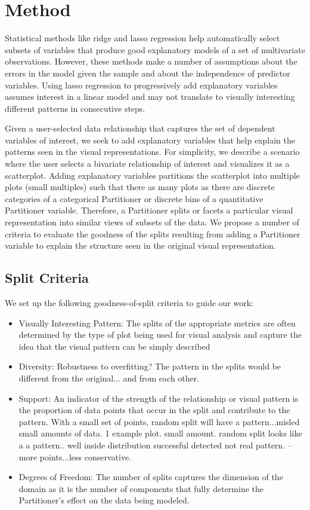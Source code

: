 \section{Method}
Statistical methods like ridge and lasso regression help automatically select subsets of variables that produce good explanatory models of a set of multivariate observations. However, these methods make a number of assumptions about the errors in the model given the sample and about the independence of predictor variables. Using lasso regression to progressively add explanatory variables assumes interest in a linear model and may not translate to visually interesting different patterns in consecutive steps. 

Given a user-selected data relationship that captures the set of dependent variables of interest, we seek to add explanatory variables that help explain the patterns seen in the visual representations. For simplicity, we describe a scenario where the user selects a bivariate relationship of interest and visualizes it as a scatterplot. Adding explanatory variables partitions the scatterplot into multiple plots (small multiples) such that there as many plots as there are discrete categories of a categorical Partitioner or discrete bins of a quantitative Partitioner variable. Therefore, a Partitioner splits or facets a particular visual representation into similar views of subsets of the data. We propose a number of criteria to evaluate the goodness of the splits resulting from adding a Partitioner variable to explain the structure seen in the original visual representation.

\subsection{Split Criteria}
We set up the following goodness-of-split criteria to guide our work:
\begin{itemize}
\item Visually Interesting Pattern: The splits of the  appropriate metrics are often determined by the type of plot being used for visual analysis and capture the idea that the visual pattern can be simply described

\item Diversity: Robustness to overfitting? The pattern in the splits would be different from the original... and from each other. 
\item Support: An indicator of the strength of the relationship or visual pattern is the proportion of data points that occur in the split and contribute to the pattern. With a small set of points, random split will have a pattern...misled small amounts of data. 1 example plot. small amount. random split looks like a a pattern.. well inside distribution successful detected not real pattern.
-- more points...less conservative.

\item Degrees of Freedom: The number of splits captures the dimension of the domain as it is the number of components that fully determine the Partitioner's effect on the data being modeled.
\end{itemize}

